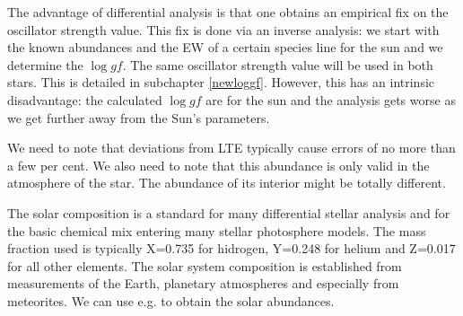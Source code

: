 \documentclass[dvips,12pt,a4paper]{report}
\begin{document}
{The advantage of differential analysis is that one obtains an empirical fix on the oscillator strength value. This fix is done via an inverse analysis: we start with the known abundances and the EW of a certain species line for the sun and we determine the $\log gf$. The same oscillator strength value will be used in both stars. This is detailed in subchapter \ref{newloggf}. However, this has an intrinsic disadvantage: the calculated $\log gf$ are for the sun and the analysis gets worse as we get further away from the Sun's parameters. 

We need to note that deviations from LTE typically cause errors of no more than a few per cent. We also need to note that this abundance is only valid in the atmosphere of the star. The abundance of its interior might be totally different.

The solar composition is a standard for many differential stellar analysis and for the basic chemical mix entering many stellar photosphere models. The mass fraction used is typically X=0.735 for hidrogen, Y=0.248 for helium and Z=0.017 for all other elements. The solar system composition is established from measurements of the Earth, planetary atmospheres and especially from meteorites. We can use e.g. \citet{Anders-1989} to obtain the solar abundances.





}
\end{document}
